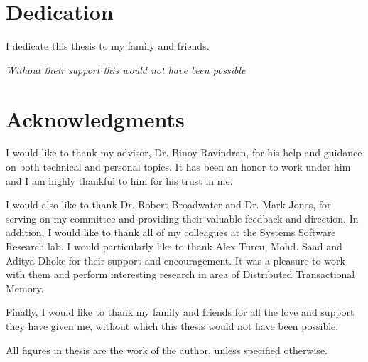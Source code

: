 \documentclass[12pt,english]{report}
\begin{document}
\pagebreak

\chapter*{Dedication}

\begin{center}
I dedicate this thesis to my family and friends.

\textit{Without their support this would not have been possible}

\end{center}


\chapter*{Acknowledgments}

I would like to thank my advisor, Dr. Binoy Ravindran, for his 
help and guidance on both technical and personal 
topics. It has been an honor to work under him and I am highly thankful
to him for his trust in me.

I would also like to thank Dr. Robert Broadwater and Dr. Mark Jones,
for serving on my committee and providing their valuable feedback
and direction. In addition, I would like to thank all of my colleagues
at the Systems Software Research lab. I would particularly like to thank
Alex Turcu, Mohd. Saad and Aditya Dhoke for their support and encouragement.
It was a pleasure to work with them and perform interesting research in area 
of Distributed Transactional Memory.

Finally, I would like to thank my family and friends for all the
love and support they have given me, without which this thesis would 
not have been possible.

All figures in thesis are the work of the author, unless specified otherwise.

\tableofcontents
\pagebreak

\listoffigures
\pagebreak


\listoftables
\pagebreak


\pagestyle{myheadings}


\end{document}
